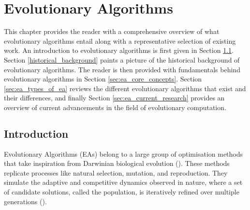 \chapter{Evolutionary Algorithms}\label{chapter_ea}

\noindent This chapter provides the reader with a comprehensive overview of what evolutionary algorithms entail along with a representative selection of existing work. An introduction to evolutionary algorithms is first given in Section \ref{ea_introduction}. Section \ref{historical_background} paints a picture of the historical background of evolutionary algorithms. The reader is then provided with fundamentals behind evolutionary algorithms in Section \ref{sec:ea_core_concepts}. Section \ref{sec:ea_types_of_ea} reviews the different evolutionary algorithms that exist and their differences, and finally Section \ref{sec:ea_current_research} provides an overview of current advancements in the field of evolutionary computation.

\section{Introduction}\label{ea_introduction}
Evolutionary Algorithms (EAs) belong to a large group of optimisation methods that take inspiration from Darwinian biological evolution (\cite{book_introduction_to_evolutionary_computing}). These methods replicate processes like natural selection, mutation, and reproduction. They simulate the adaptive and competitive dynamics observed in nature, where a set of candidate solutions, called the population, is iteratively refined over multiple generations (\cite{basicsOfEvolutionaryComputing}). 

